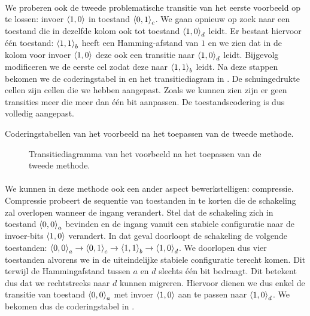 \paragraph{}
We proberen ook de tweede problematische transitie van het eerste voorbeeld op te lossen: invoer $\left\langle 1,0 \right\rangle$ in toestand $\left\langle 0,1 \right\rangle_c$. We gaan opnieuw op zoek naar een toestand die in dezelfde kolom ook tot toestand $\left\langle 1,0 \right\rangle_d$ leidt. Er bestaat hiervoor \'e\'en toestand: $\left\langle 1,1 \right\rangle_b$ heeft een Hamming-afstand van $1$ en we zien dat in de kolom voor invoer $\left\langle 1,0 \right\rangle$ deze ook een transitie naar $\left\langle 1,0 \right\rangle_d$ leidt. Bijgevolg modificeren we de eerste cel zodat deze naar $\left\langle 1,1 \right\rangle_b$ leidt. Na deze stappen bekomen we de coderingstabel in  en het transitiediagram in . De schuingedrukte cellen zijn cellen die we hebben aangepast. Zoals we kunnen zien zijn er geen transities meer die meer dan \'e\'en bit aanpassen. De toestandscodering is dus volledig aangepast.
\begin{table}[hbt]
\centering
{}
\caption{Coderingstabellen van het voorbeeld na het toepassen van de tweede methode.}
\end{table}
\begin{figure}[hbt]
\centering
{}
\caption{Transitiediagramma van het voorbeeld na het toepassen van de tweede methode.}
\end{figure}
\paragraph{}
We kunnen in deze methode ook een ander aspect bewerkstelligen: compressie. Compressie probeert de sequentie van toestanden in te korten die de schakeling zal overlopen wanneer de ingang verandert. Stel dat de schakeling zich in toestand $\left\langle 0,0 \right\rangle_a$ bevinden en de ingang vanuit een stabiele configuratie naar de invoer-bits $\left\langle 1,0 \right\rangle$ verandert. In dat geval doorloopt de schakeling de volgende toestanden: $\left\langle 0,0 \right\rangle_a\rightarrow\left\langle 0,1 \right\rangle_c\rightarrow\left\langle 1,1 \right\rangle_b\rightarrow\left\langle 1,0 \right\rangle_d$. We doorlopen dus vier toestanden alvorens we in de uiteindelijke stabiele configuratie terecht komen. Dit terwijl de Hammingafstand tussen $a$ en $d$ slechts \'e\'en bit bedraagt. Dit betekent dus dat we rechtstreeks naar $d$ kunnen migreren. Hiervoor dienen we dus enkel de transitie van toestand $\left\langle 0,0 \right\rangle_a$ met invoer $\left\langle 1,0 \right\rangle$ aan te passen naar $\left\langle 1,0 \right\rangle_d$. We bekomen dus de coderingstabel in .
